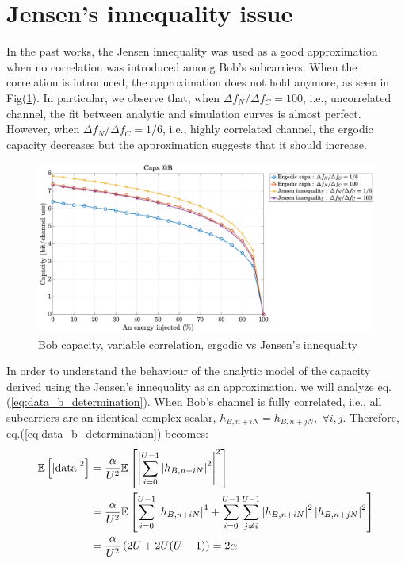 \documentclass[12pt]{article}
\begin{document}
\section{Jensen's innequality issue}
In the past works, the Jensen innequality was used as a good approximation when no correlation was introduced among Bob's subcarriers. When the correlation is introduced, the approximation does not hold anymore, as seen in Fig(\ref{fig:capaB_ergo_jensen}). In particular, we observe that, when $\Delta f_N / \Delta f_C = 100$, i.e., uncorrelated channel, the fit between analytic and simulation curves is almost perfect. However, when $\Delta f_N / \Delta f_C = 1/6$, i.e., highly correlated channel, the ergodic capacity decreases but the approximation suggests that it should increase. 
\begin{figure}[htb!]
	\centering
	\includegraphics[width=.75\linewidth]{img/capaB_ergoVSjensen.eps}
	\caption{Bob capacity, variable correlation, ergodic vs Jensen's innequality}
	\label{fig:capaB_ergo_jensen}
\end{figure} 
In order to understand the behaviour of the analytic model of the capacity derived using the Jensen's innequality as an approximation, we will analyze eq.(\ref{eq:data_b_determination}). When Bob's channel is fully correlated, i.e., all subcarriers are an identical complex scalar, $h_{B,n+iN} = h_{B,n+jN}, \; \forall i,j$. Therefore, eq.(\ref{eq:data_b_determination}) becomes:
\begin{equation}
\begin{split}
\mathbb{E} \left[\left| \text{data}\right|^2\right] &=  \frac{\alpha}{U^2} \mathbb{E} \left[\left|\sum_{i=0}^{U-1} \left|h_{B,n+iN}\right|^2\right|^2\right] \\
&=  \frac{\alpha}{U^2} \mathbb{E} \left[\sum_{i=0}^{U-1} \left|h_{B,n+iN}\right|^4  + \sum_{i=0}^{U-1}\sum_{j \neq i}^{U-1} \left|h_{B,n+iN}\right|^2  \left|h_{B,n+jN}\right|^2 \right] \\
&=  \frac{\alpha}{U^2} \left(2U + 2U(U-1) \right)= 2\alpha
\label{eq:data_b_determination_fullCorrel}
\end{split}
\end{equation}
\end{document}
